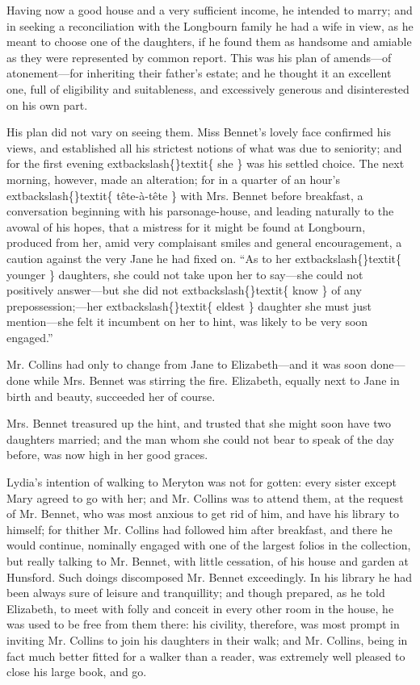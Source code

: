 \documentclass[10pt]{book}
\begin{document}
   Having now a good house and a very sufficient income, he intended to
marry; and in seeking a reconciliation with the Longbourn family he had
a wife in view, as he
   meant to choose one of the daughters, if he found
them as handsome and amiable as they were represented by common report.
This was his plan of amends—of atonement—for inheriting their father’s
estate; and he thought it an excellent one, full of eligibility and
suitableness, and excessively generous and disinterested on his own
part.
  

   His plan did not vary on seeing them. Miss Bennet’s lovely face
confirmed his views, and established all his strictest notions of what
was due to seniority; and for the first evening
   	extbackslash\{\}textit\{
    she
   \}
   was his settled
choice. The next morning, however, made an alteration; for in a quarter
of an hour’s
   	extbackslash\{\}textit\{
    tête-à-tête
   \}
   with Mrs. Bennet before breakfast, a
conversation beginning with his parsonage-house, and leading naturally
to the avowal of his hopes, that a mistress for it might be found at
Longbourn, produced from her, amid very complaisant smiles and general
encouragement, a caution against the very Jane he had fixed on. “As to
her
   	extbackslash\{\}textit\{
    younger
   \}
   daughters, she could not take upon her to say—she could
not positively answer—but she did not
   	extbackslash\{\}textit\{
    know
   \}
   of any prepossession;—her
   	extbackslash\{\}textit\{
    eldest
   \}
   daughter she must just mention—she felt it incumbent on her to
hint, was likely to be very soon engaged.”
  

   Mr. Collins had only to change from Jane to Elizabeth—and it was soon
done—done while Mrs. Bennet was stirring the fire. Elizabeth, equally
next to Jane in birth and beauty, succeeded her of course.
  

   Mrs. Bennet treasured up the hint, and trusted that she might soon have
two daughters married; and the man whom she could not bear to speak of
the day before, was now high in her good graces.
  

   Lydia’s intention of walking to Meryton was not for
   gotten: every sister
except Mary agreed to go with her; and Mr. Collins was to attend them,
at the request of Mr. Bennet, who was most anxious to get rid of him,
and have his library to himself; for thither Mr. Collins had followed
him after breakfast, and there he would continue, nominally engaged with
one of the largest folios in the collection, but really talking to Mr.
Bennet, with little cessation, of his house and garden at Hunsford. Such
doings discomposed Mr. Bennet exceedingly. In his library he had been
always sure of leisure and tranquillity; and though prepared, as he told
Elizabeth, to meet with folly and conceit in every other room in the
house, he was used to be free from them there: his civility, therefore,
was most prompt in inviting Mr. Collins to join his daughters in their
walk; and Mr. Collins, being in fact much better fitted for a walker
than a reader, was extremely well pleased to close his large book, and
go.
  
\end{document}
